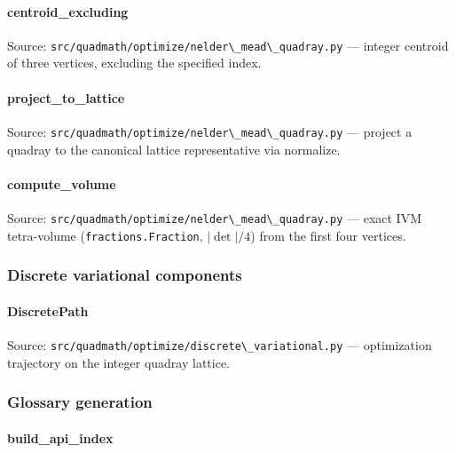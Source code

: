 \documentclass[
  10pt,
]{article}
\newcommand{\passthrough}[1]{#1}
\renewcommand{\texttt}[1]{%
    \colorbox{codebg}{\color{codefg}\ttfamily #1}%
}
\begin{document}
\paragraph{\texorpdfstring{\texttt{centroid\_excluding}}{centroid\_excluding}}\label{code:centroid_excluding}

Source:
\passthrough{\lstinline!src/quadmath/optimize/nelder\_mead\_quadray.py!}
--- integer centroid of three vertices, excluding the specified index.

\paragraph{\texorpdfstring{\texttt{project\_to\_lattice}}{project\_to\_lattice}}\label{code:project_to_lattice}

Source:
\passthrough{\lstinline!src/quadmath/optimize/nelder\_mead\_quadray.py!}
--- project a quadray to the canonical lattice representative via
normalize.

\paragraph{\texorpdfstring{\texttt{compute\_volume}}{compute\_volume}}\label{code:compute_volume}

Source:
\passthrough{\lstinline!src/quadmath/optimize/nelder\_mead\_quadray.py!}
--- exact IVM tetra-volume
(\passthrough{\lstinline!fractions.Fraction!}, \(|\det|/4\)) from the
first four vertices.

\subsubsection{Discrete variational
components}\label{code:discrete_variational}

\paragraph{\texorpdfstring{\texttt{DiscretePath}}{DiscretePath}}\label{code:DiscretePath}

Source:
\passthrough{\lstinline!src/quadmath/optimize/discrete\_variational.py!}
--- optimization trajectory on the integer quadray lattice.

\subsubsection{Glossary generation}\label{code:glossary}

\paragraph{\texorpdfstring{\texttt{build\_api\_index}}{build\_api\_index}}\label{code:build_api_index}
\end{document}

